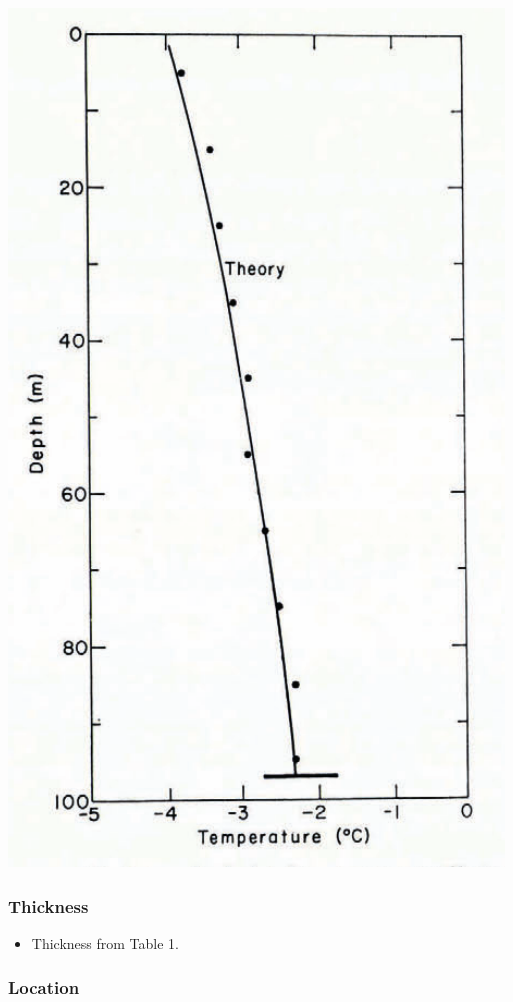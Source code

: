\documentclass[article,a4paper,times,11pt,twoside]{article}
\begin{document}
\begin{center}
\includegraphics[width=.9\linewidth]{isua_10/isua_10.png}
\end{center}

\subsubsection{Thickness}
\label{sec:org5564125}

\begin{itemize}
\item Thickness from \textcite{colbeck_1979} Table 1.
\end{itemize}

\subsubsection{Location}
\label{sec:org7653cf4}
\end{document}
